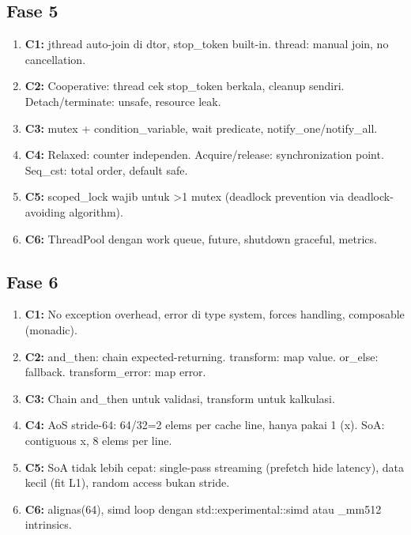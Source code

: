\documentclass[12pt,a4paper]{article}
\begin{document}
\subsection*{Fase 5}
\begin{enumerate}
  \item \textbf{C1:} jthread auto-join di dtor, stop_token built-in. thread: manual join, no cancellation.
  \item \textbf{C2:} Cooperative: thread cek stop_token berkala, cleanup sendiri. Detach/terminate: unsafe, resource leak.
  \item \textbf{C3:} mutex + condition_variable, wait predicate, notify_one/notify_all.
  \item \textbf{C4:} Relaxed: counter independen. Acquire/release: synchronization point. Seq_cst: total order, default safe.
  \item \textbf{C5:} scoped_lock wajib untuk >1 mutex (deadlock prevention via deadlock-avoiding algorithm).
  \item \textbf{C6:} ThreadPool dengan work queue, future, shutdown graceful, metrics.
\end{enumerate}

\subsection*{Fase 6}
\begin{enumerate}
  \item \textbf{C1:} No exception overhead, error di type system, forces handling, composable (monadic).
  \item \textbf{C2:} and_then: chain expected-returning. transform: map value. or_else: fallback. transform_error: map error.
  \item \textbf{C3:} Chain and_then untuk validasi, transform untuk kalkulasi.
  \item \textbf{C4:} AoS stride-64: 64/32=2 elems per cache line, hanya pakai 1 (x). SoA: contiguous x, 8 elems per line.
  \item \textbf{C5:} SoA tidak lebih cepat: single-pass streaming (prefetch hide latency), data kecil (fit L1), random access bukan stride.
  \item \textbf{C6:} alignas(64), simd loop dengan std::experimental::simd atau _mm512 intrinsics.
\end{enumerate}
\end{document}
